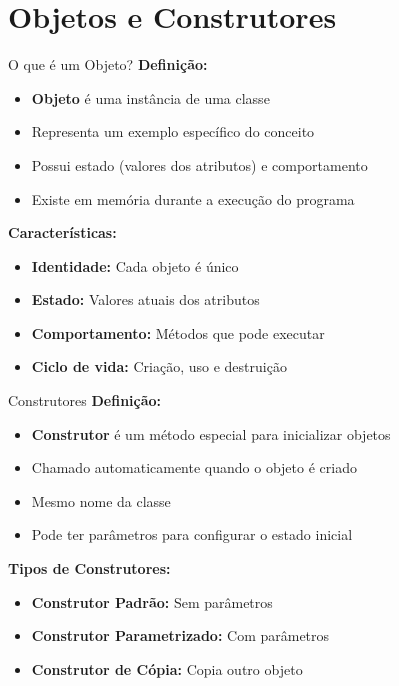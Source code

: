 \documentclass[aspectratio=169]{beamer}
\begin{document}
\section{Objetos e Construtores}

\begin{frame}{O que é um Objeto?}
\textbf{Definição:}
\begin{itemize}
    \item \textbf{Objeto} é uma instância de uma classe
    \item Representa um exemplo específico do conceito
    \item Possui estado (valores dos atributos) e comportamento
    \item Existe em memória durante a execução do programa
\end{itemize}

\textbf{Características:}
\begin{itemize}
    \item \textbf{Identidade:} Cada objeto é único
    \item \textbf{Estado:} Valores atuais dos atributos
    \item \textbf{Comportamento:} Métodos que pode executar
    \item \textbf{Ciclo de vida:} Criação, uso e destruição
\end{itemize}
\end{frame}

\begin{frame}{Construtores}
\textbf{Definição:}
\begin{itemize}
    \item \textbf{Construtor} é um método especial para inicializar objetos
    \item Chamado automaticamente quando o objeto é criado
    \item Mesmo nome da classe
    \item Pode ter parâmetros para configurar o estado inicial
\end{itemize}

\textbf{Tipos de Construtores:}
\begin{itemize}
    \item \textbf{Construtor Padrão:} Sem parâmetros
    \item \textbf{Construtor Parametrizado:} Com parâmetros
    \item \textbf{Construtor de Cópia:} Copia outro objeto
\end{itemize}
\end{frame}
\end{document}
